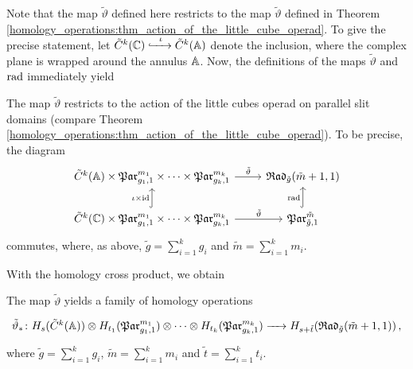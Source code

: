 Note that the map $\tilde \vartheta$ defined here restricts to the map $\tilde \vartheta$ defined in Theorem \ref{homology_operations:thm_action_of_the_little_cube_operad}.
To give the precise statement, let $\tilde C^k(\mathbb C) \xhookrightarrow{\hspace{6pt}{\iota}\hspace{6pt}} \tilde C^k(\mathbb A)$ denote the inclusion, where the complex plane is wrapped around the annulus $\mathbb A$.
Now, the definitions of the maps $\tilde \vartheta$ and $\operatorname{rad}$ immediately yield

\begin{prop}
\label{rad_par_operad}
    The map $\tilde \vartheta$ restricts to the action of the little cubes operad on parallel slit domains (compare Theorem \ref{homology_operations:thm_action_of_the_little_cube_operad}).
    To be precise, the diagram
    \[
    \begin{tikzcd}
       \tilde C^k(\A) \times \mathfrak{Par}_{g_1, 1}^{m_1} \times \dotsb \times \mathfrak{Par}_{g_k, 1}^{m_k} \arrow{r}{\tilde \vartheta} & \Radt_{\tilde g}(\tilde m + 1, 1) \\
       \tilde C^k(\C) \times \mathfrak{Par}_{g_1, 1}^{m_1} \times \dotsb \times \mathfrak{Par}_{g_k, 1}^{m_k} \arrow{r}{\tilde \vartheta} \arrow[hookrightarrow]{u}{\iota \times \text{id}} & \mathfrak{Par}_{\tilde g, 1}^{\tilde m} \arrow[hookrightarrow]{u}{\radmap}
    \end{tikzcd}
   \]
   commutes, where, as above, $\tilde g = \sum_{i = 1}^{k} g_i$ and $\tilde m = \sum_{i = 1}^k m_i$.
\end{prop}
   
With the homology cross product, we obtain

\begin{prop}
   The map $\tilde \vartheta$ yields a family of homology operations
   \[\begin{tikzcd}
      \tilde \vartheta_* \colon H_s(\tilde C^k(\A)) \otimes H_{t_1}(\mathfrak{Par}_{g_1, 1}^{m_1}) \otimes \dotsb \otimes H_{t_k}(\mathfrak{Par}_{g_k, 1}^{m_k}) \to H_{s+\tilde t}(\Radt_{\tilde g}(\tilde m + 1, 1))\,, 
   \end{tikzcd}\]
   where $\tilde g = \sum_{i = 1}^{k} g_i$, $\tilde m = \sum_{i = 1}^k m_i$ and $\tilde t = \sum_{i = 1}^k t_i$.
\end{prop}

